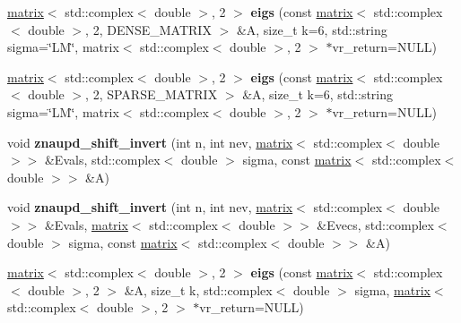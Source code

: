 \begin{DoxyCompactItemize}
\item 
\hypertarget{namespacekeycpp_acf115de4d97d1f78157f3264ca253b08}{\hyperlink{classkeycpp_1_1matrix}{matrix}$<$ std\-::complex$<$ double $>$, 2 $>$ {\bfseries eigs} (const \hyperlink{classkeycpp_1_1matrix}{matrix}$<$ std\-::complex$<$ double $>$, 2, D\-E\-N\-S\-E\-\_\-\-M\-A\-T\-R\-I\-X $>$ \&A, size\-\_\-t k=6, std\-::string sigma=\char`\"{}L\-M\char`\"{}, matrix$<$ std\-::complex$<$ double $>$, 2 $>$ $\ast$vr\-\_\-return=N\-U\-L\-L)}\label{namespacekeycpp_acf115de4d97d1f78157f3264ca253b08}

\item 
\hypertarget{namespacekeycpp_aff34abc1339750817eab644908b5710f}{\hyperlink{classkeycpp_1_1matrix}{matrix}$<$ std\-::complex$<$ double $>$, 2 $>$ {\bfseries eigs} (const \hyperlink{classkeycpp_1_1matrix}{matrix}$<$ std\-::complex$<$ double $>$, 2, S\-P\-A\-R\-S\-E\-\_\-\-M\-A\-T\-R\-I\-X $>$ \&A, size\-\_\-t k=6, std\-::string sigma=\char`\"{}L\-M\char`\"{}, matrix$<$ std\-::complex$<$ double $>$, 2 $>$ $\ast$vr\-\_\-return=N\-U\-L\-L)}\label{namespacekeycpp_aff34abc1339750817eab644908b5710f}

\item 
\hypertarget{namespacekeycpp_a82061266615ad24ba5b25324aae1cc12}{void {\bfseries znaupd\-\_\-shift\-\_\-invert} (int n, int nev, \hyperlink{classkeycpp_1_1matrix}{matrix}$<$ std\-::complex$<$ double $>$$>$ \&Evals, std\-::complex$<$ double $>$ sigma, const \hyperlink{classkeycpp_1_1matrix}{matrix}$<$ std\-::complex$<$ double $>$$>$ \&A)}\label{namespacekeycpp_a82061266615ad24ba5b25324aae1cc12}

\item 
\hypertarget{namespacekeycpp_ae57a4ddfa1c5ed22c8999a7cbb1daac2}{void {\bfseries znaupd\-\_\-shift\-\_\-invert} (int n, int nev, \hyperlink{classkeycpp_1_1matrix}{matrix}$<$ std\-::complex$<$ double $>$$>$ \&Evals, \hyperlink{classkeycpp_1_1matrix}{matrix}$<$ std\-::complex$<$ double $>$$>$ \&Evecs, std\-::complex$<$ double $>$ sigma, const \hyperlink{classkeycpp_1_1matrix}{matrix}$<$ std\-::complex$<$ double $>$$>$ \&A)}\label{namespacekeycpp_ae57a4ddfa1c5ed22c8999a7cbb1daac2}

\item 
\hypertarget{namespacekeycpp_aed068334768b69cdd07d81f766334dd2}{\hyperlink{classkeycpp_1_1matrix}{matrix}$<$ std\-::complex$<$ double $>$, 2 $>$ {\bfseries eigs} (const \hyperlink{classkeycpp_1_1matrix}{matrix}$<$ std\-::complex$<$ double $>$, 2 $>$ \&A, size\-\_\-t k, std\-::complex$<$ double $>$ sigma, \hyperlink{classkeycpp_1_1matrix}{matrix}$<$ std\-::complex$<$ double $>$, 2 $>$ $\ast$vr\-\_\-return=N\-U\-L\-L)}\label{namespacekeycpp_aed068334768b69cdd07d81f766334dd2}


\end{DoxyCompactItemize}
